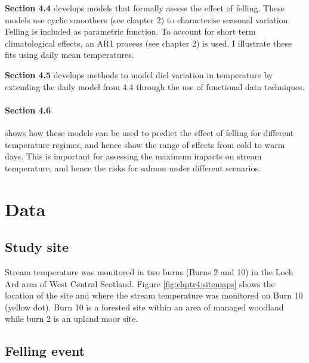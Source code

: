 \textbf{Section 4.4} develops models that formally assess the effect of felling. These models use cyclic smoothers (see chapter 2) to characterise seasonal variation. Felling is included as parametric function.  To account for short term climatological effects, an AR1 process (see chapter 2) is used.  I illustrate these fits using daily mean temperatures.

\textbf{Section 4.5} develops methods to model diel variation in temperature by extending the daily model from 4.4 through the use of functional data techniques.

\paragraph{Section 4.6} shows how these models can be used to predict the effect of felling for different temperature regimes, and hence show the range of effects from cold to warm days.  This is important for assessing the maximum impacts on stream temperature, and hence the risks for salmon under different scenarios.




\section{Data}

\subsection{Study site}

Stream temperature was monitored in two burns (Burns 2 and 10) in the Loch Ard area of West Central Scotland.  Figure \ref{fig:chptr4:sitemaps} shows the location of the site and where the stream temperature was monitored on Burn 10 (yellow dot). Burn 10 is a forested site within an area of managed woodland while burn 2 is an upland moor site.




\subsection{Felling event}

